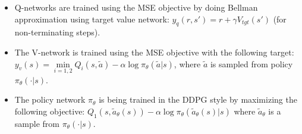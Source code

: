 \begin{itemize}
	\item Q-networks are trained using the MSE objective by doing Bellman approximation using target value network: \begin{math}y_q(r,s') = r + \gamma V_{tgt}(s')\end{math}
	(for non-terminating steps).
	\item The V-network is trained using the MSE objective with the following target: 
	\begin{math}y_v(s) = \min\limits_{i=1,2}Q_i(s,\tilde{a}) - \alpha \log \pi_\theta(\tilde{a}|s)\end{math}, where \begin{math}\tilde{a}\end{math} is 
	sampled from policy \begin{math}\pi_\theta(\cdot|s)\end{math}.
	\item The policy network \begin{math}\pi_\theta\end{math} is being trained in the DDPG style by maximizing the following objective: 
	\begin{math}Q_1(s,\tilde{a}_\theta(s)) - \alpha \log \pi_\theta(\tilde{a}_\theta(s)|s)\end{math}
	where \begin{math}\tilde{a}_\theta\end{math} is a sample from 
	\begin{math}\pi_\theta(\cdot|s)\end{math}.
\end{itemize}



